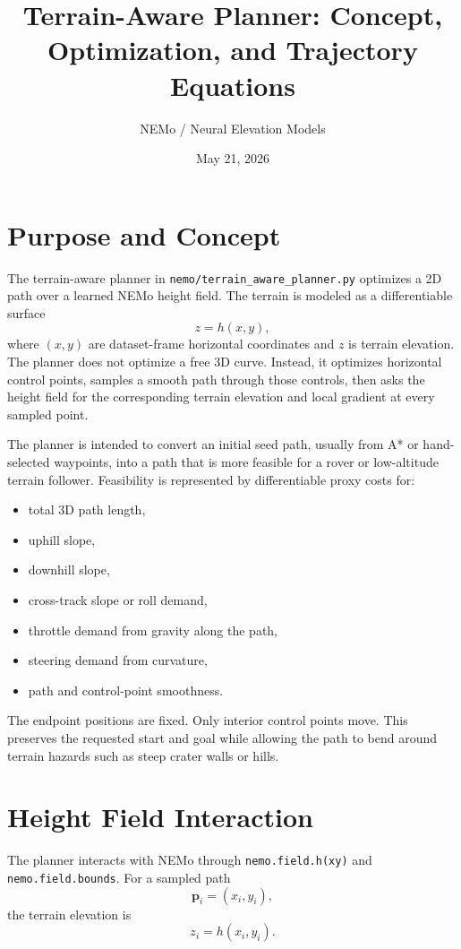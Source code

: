 \documentclass[11pt]{article}
\title{Terrain-Aware Planner: Concept, Optimization, and Trajectory Equations}
\author{NEMo / Neural Elevation Models}
\date{May 21, 2026}
\begin{document}
\maketitle

\section{Purpose and Concept}

The terrain-aware planner in \texttt{nemo/terrain\_aware\_planner.py} optimizes a 2D path over a learned NEMo height field. The terrain is modeled as a differentiable surface
\[
  z = h(x,y),
\]
where \((x,y)\) are dataset-frame horizontal coordinates and \(z\) is terrain elevation. The planner does not optimize a free 3D curve. Instead, it optimizes horizontal control points, samples a smooth path through those controls, then asks the height field for the corresponding terrain elevation and local gradient at every sampled point.

The planner is intended to convert an initial seed path, usually from A* or hand-selected waypoints, into a path that is more feasible for a rover or low-altitude terrain follower. Feasibility is represented by differentiable proxy costs for:

\begin{itemize}[leftmargin=*]
  \item total 3D path length,
  \item uphill slope,
  \item downhill slope,
  \item cross-track slope or roll demand,
  \item throttle demand from gravity along the path,
  \item steering demand from curvature,
  \item path and control-point smoothness.
\end{itemize}

The endpoint positions are fixed. Only interior control points move. This preserves the requested start and goal while allowing the path to bend around terrain hazards such as steep crater walls or hills.

\section{Height Field Interaction}

The planner interacts with NEMo through \texttt{nemo.field.h(xy)} and \texttt{nemo.field.bounds}. For a sampled path
\[
  \mathbf{p}_i = (x_i,y_i),
\]
the terrain elevation is
\[
  z_i = h(x_i,y_i).
\]
\end{document}
